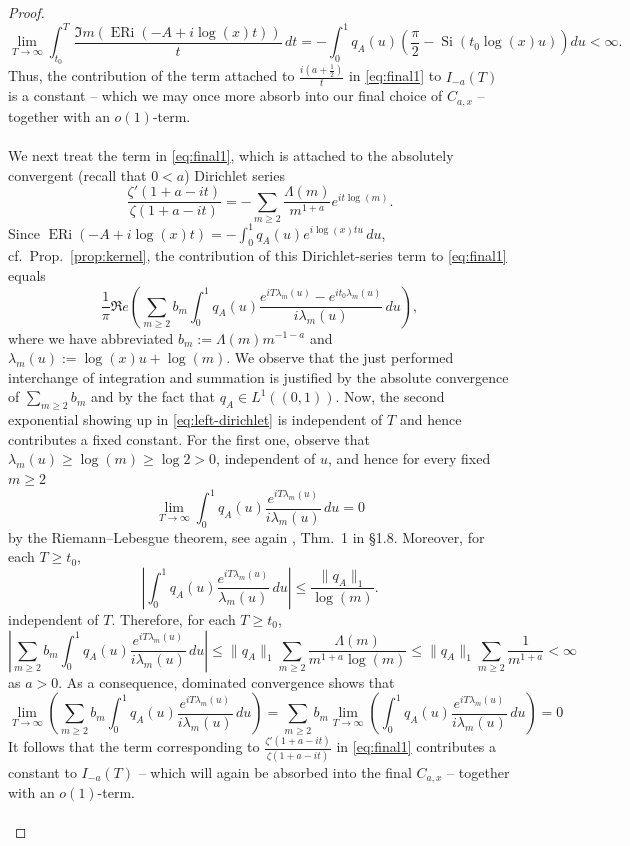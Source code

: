 \documentclass[a4paper,10pt]{amsart}
\DeclareMathOperator{\ERi}{ERi}
\theoremstyle{definition}
\numberwithin{equation}{section}
\begin{document}
\begin{proof}
$$
\lim_{T\to\infty}\int_{t_0}^T\frac{\Im m(\ERi(-A+i\log(x)t))}{t}\,dt = -\int_0^1q_A(u) \left(\frac{\pi}{2}-\operatorname{Si}(t_0\log(x)u)\right)du<\infty.
$$
Thus, the contribution of the term attached to $\frac{i(a+\tfrac12)}{t}$ in \eqref{eq:final1} to $I_{-a}(T)$ is a constant -- which we may once more absorb into our final choice of $C_{a,x}$ -- together with an $o(1)$-term.\\\\
We next treat the term in \eqref{eq:final1}, which is attached to the absolutely convergent (recall that $0<a$) Dirichlet series
$$
\frac{\zeta'(1+a-it)}{\zeta(1+a-it)} = -\sum_{m\ge2}\frac{\Lambda(m)}{m^{1+a}}e^{it\log(m)}.
$$
Since $\ERi(-A+i\log(x)t)=-\int_0^1q_A(u)e^{i\log(x)tu}\,du$, cf.\ Prop.\ \ref{prop:kernel}, the contribution of this Dirichlet-series term to \eqref{eq:final1} equals
\begin{equation}\label{eq:left-dirichlet}
\frac1\pi\Re e\left(\sum_{m\ge2}b_m\int_0^1q_A(u)\frac{e^{iT\lambda_m(u)}-e^{it_0\lambda_m(u)}}{i\lambda_m(u)}\,du\right),
\end{equation}
where we have abbreviated $b_m:=\Lambda(m)m^{-1-a}$ and $\lambda_m(u):=\log(x)u+\log(m)$. We observe that the just performed interchange of integration and summation is justified by the absolute convergence of $\sum_{m\geq 2} b_m$ and by the fact that $q_A\in L^1((0,1))$. Now, the second exponential showing up in \eqref{eq:left-dirichlet} is independent of $T$ and hence contributes a fixed constant. For the first one, observe that $\lambda_m(u)\geq\log(m)\geq\log2>0$, independent of $u$, and hence for every fixed $m\geq 2$
$$
\lim_{T\to\infty}\int_0^1q_A(u)\frac{e^{iT\lambda_m(u)}}{i\lambda_m(u)}\,du=0
$$
by the Riemann--Lebesgue theorem, see again \cite{TitchmarshFourier}, Thm.\ 1 in \S1.8. Moreover, for each $T\geq t_0$,
$$
\left|\int_0^1q_A(u)\frac{e^{iT\lambda_m(u)}}{\lambda_m(u)}\,du\right|\le\frac{\|q_A\|_1}{\log(m)}.
$$
independent of $T$. Therefore, for each $T\geq t_0$,
$$\left|\sum_{m\ge2}b_m\int_0^1q_A(u)\frac{e^{iT\lambda_m(u)}}{i\lambda_m(u)}\,du\right| \leq \|q_A\|_1\sum_{m\ge2}\frac{\Lambda(m)}{m^{1+a}\log(m)}\leq \|q_A\|_1\sum_{m\ge2}\frac{1}{m^{1+a}}<\infty$$
as $a>0$. As a consequence, dominated convergence shows that 
$$\lim_{T\to\infty}\left(\sum_{m\ge2}b_m\int_0^1q_A(u)\frac{e^{iT\lambda_m(u)}}{i\lambda_m(u)}\,du\right) = \sum_{m\ge2}b_m \lim_{T\to\infty}\left(\int_0^1q_A(u)
\frac{e^{iT\lambda_m(u)}}{i\lambda_m(u)}\,du\right)= 0$$
It follows that the term corresponding to $\frac{\zeta'(1+a-it)}{\zeta(1+a-it)} $ in \eqref{eq:final1} contributes a constant to $I_{-a}(T)$ -- which will again be absorbed into the final $C_{a,x}$ -- together with an $o(1)$-term.\\\\

\end{proof}
\end{document}

